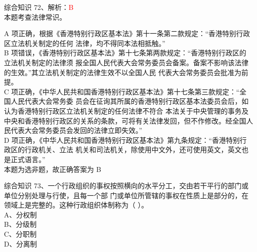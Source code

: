 \documentclass[aspectratio=169]{beamer}
\begin{document}
\begin{frame}[t]{综合知识}
    72、解析：\textcolor{red}{B}\\
    本题考查法律常识。\\
    { \small

    A 项正确，根据《香港特别行政区基本法》第十一条第二款规定：“香港特别行政区立法机关制定的任何
    法律，均不得同本法相抵触。”\\

    B 项错误，《香港特别行政区基本法》第十七条第两款规定：“香港特别行政区的立法机关制定的法律须
    报全国人民代表大会常务委员会备案。备案不影响该法律的生效。”其立法机关制定的法律生效不以全国人民
    代表大会常务委员会批准为前提。\\

    C 项正确，《中华人民共和国香港特别行政区基本法》第十七条第三款规定：“全国人民代表大会常务委
    员会在征询其所属的香港特别行政区基本法委员会后，如认为香港特别行政区立法机关制定的任何法律不符合
    本法关于中央管理的事务及中央和香港特别行政区的关系的条款，可将有关法律发回，但不作修改。经全国人
    民代表大会常务委员会发回的法律立即失效。”\\

    D 项正确，《中华人民共和国香港特别行政区基本法》第九条规定：“香港特别行政区的行政机关、立法
    机关和司法机关，除使用中文外，还可使用英文，英文也是正式语言。”\\

    本题为选非题，故正确答案为 B\\

    }
\end{frame}                           


\begin{frame}[t]{综合知识}
    73、一个行政组织的事权按照横向的水平分工，交由若干平行的部门或单位分别处理与行使，且每一个部
    门或单位所管辖的事权在性质上是部分的，在领域上是完整的。这种行政组织体制称为（ ）。 \\
    A、分权制                                                                           \\
    B、分级制                                                                           \\
    C、分职制                                                                           \\
    D、分离制                                                                           \\
\end{frame}                           
\end{document}
